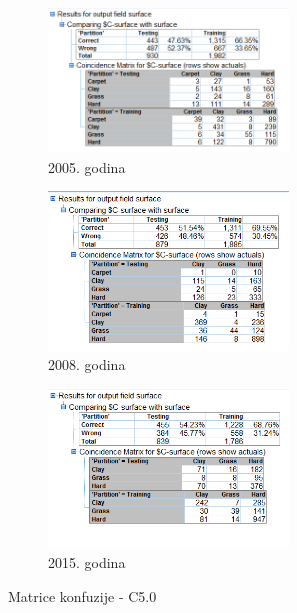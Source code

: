 \documentclass[a4paper]{article}
\begin{document}
\begin{figure}[H]
	\begin{subfigure}[h]{\textwidth}
		\begin{center}
			\includegraphics[width=0.7\textwidth]{Klasifikacija/C50/Analysis_Surface2005.png}
		\end{center}
		\caption{2005. godina}
		\label{fig:MatricaKnfuzijeC502005}
	\end{subfigure}
	\vspace{0.2cm}
	\begin{subfigure}[h]{\textwidth}
		\begin{center}
			\includegraphics[width=0.7\textwidth]{Klasifikacija/C50/Analysis_Surface2008.png}
		\end{center}
		\caption{2008. godina}
		\label{fig:MatricaKnfuzijeC502008}
	\end{subfigure}
	\vspace{0.2cm}
	\begin{subfigure}[h]{\textwidth}
		\begin{center}
			\includegraphics[width=0.7\textwidth]{Klasifikacija/C50/Analysis_Surface2015.png}
		\end{center}
		\caption{2015. godina}
		\label{fig:MatricaKnfuzijeC502015}
	\end{subfigure}
	\caption{Matrice konfuzije - C5.0}
	\label{fig:MatricaKnfuzijeC50}
\end{figure}
\end{document}
